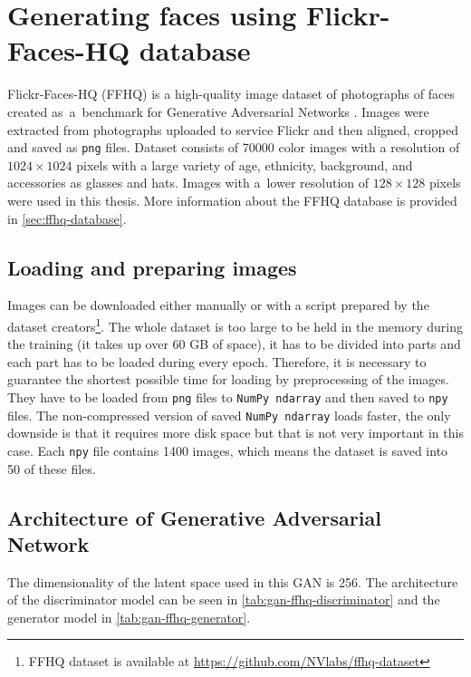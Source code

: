 \section{\label{sec:ffhq-gan}Generating faces using Flickr-Faces-HQ database}
Flickr-Faces-HQ (FFHQ) is a high-quality image dataset of photographs of faces created as~a~benchmark for Generative Adversarial Networks \cite{karras2018stylebased}. Images were extracted from photographs uploaded to service Flickr and then aligned, cropped and saved as \texttt{png} files. Dataset consists of 70000 color images with a resolution of $1024 \times 1024$ pixels with a large variety of age, ethnicity, background, and accessories as glasses and hats. Images with a~lower resolution of $128 \times 128$ pixels were used in this thesis. More information about the FFHQ database is provided in \autoref{sec:ffhq-database}.

\subsection*{Loading and preparing images}
Images can be downloaded either manually or with a script prepared by the dataset creators\footnote{FFHQ dataset is available at \url{https://github.com/NVlabs/ffhq-dataset}}. The whole dataset is too large to be held in the memory during the training (it takes up over 60 GB of space), it has to be divided into parts and each part has to be loaded during every epoch. Therefore, it is necessary to guarantee the shortest possible time for loading by preprocessing of the images. They have to be loaded from \texttt{png} files to \texttt{NumPy ndarray} and then saved to \texttt{npy} files. The non-compressed version of saved \texttt{NumPy ndarray} loads faster, the only downside is that it requires more disk space but that is not very important in this case. Each \texttt{npy} file contains 1400 images, which means the dataset is saved into 50 of these files.

\subsection*{Architecture of Generative Adversarial Network}
The dimensionality of the latent space used in this GAN is 256. The architecture of the discriminator model can be seen in \autoref{tab:gan-ffhq-discriminator} and the generator model in \autoref{tab:gan-ffhq-generator}.

